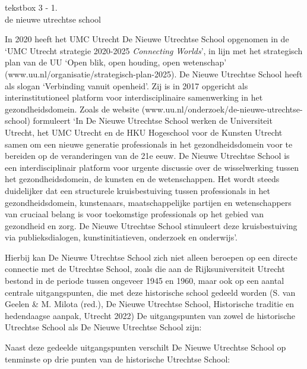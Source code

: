 \documentclass{jote-book}
\begin{document}
	\begin{bookbox}{\raggedright tekstbox 3 - 1. \\de nieuwe utrechtse school}
		In 2020 heeft het UMC Utrecht De Nieuwe Utrechtse School opgenomen in de ‘UMC Utrecht strategie 2020-2025 \emph{Connecting}\emph{ }\emph{Worlds}', in lijn met het strategisch plan van de UU ‘Open blik, open houding, open wetenschap' (www.uu.nl/organisatie/strategisch-plan-2025). De Nieuwe Utrechtse School heeft als slogan ‘Verbinding vanuit openheid'. Zij is in 2017 opgericht als interinstitutioneel platform voor interdisciplinaire samenwerking in het gezondheidsdomein. Zoals de website (www.uu.nl/onderzoek/de-nieuwe-utrechtse-school) formuleert ‘In De Nieuwe Utrechtse School werken de Universiteit Utrecht, het UMC Utrecht en de HKU Hogeschool voor de Kunsten Utrecht samen om een nieuwe generatie professionals in het gezondheidsdomein voor te bereiden op de veranderingen van de 21e eeuw. De Nieuwe Utrechtse School is een interdisciplinair platform voor urgente discussie over de wisselwerking tussen het gezondheidsdomein, de kunsten en de wetenschappen. Het wordt steeds duidelijker dat een structurele kruisbestuiving tussen professionals in het gezondheidsdomein, kunstenaars, maatschappelijke partijen en wetenschappers van cruciaal belang is voor toekomstige professionals op het gebied van gezondheid en zorg. De Nieuwe Utrechtse School stimuleert deze kruisbestuiving via publieksdialogen, kunstinitiatieven, onderzoek en onderwijs'.

		\vspace*{\baselineskip}

		Hierbij kan De Nieuwe Utrechtse School zich niet alleen beroepen op een directe connectie met de Utrechtse School, zoals die aan de Rijksuniversiteit Utrecht bestond in de periode tussen ongeveer 1945 en 1960, maar ook op een aantal centrale uitgangspunten, die met deze historische school gedeeld worden (S. van Geelen \& M. Milota (red.), De Nieuwe Utrechtse School, Historische traditie en hedendaagse aanpak, Utrecht 2022) De uitgangspunten van zowel de historische Utrechtse School als De Nieuwe Utrechtse School zijn:

		\vspace*{\baselineskip}

		Naast deze gedeelde uitgangspunten verschilt De Nieuwe Utrechtse School op tenminste op drie punten van de historische Utrechtse School:

		\vspace*{\baselineskip}


\end{bookbox}
\end{document}
